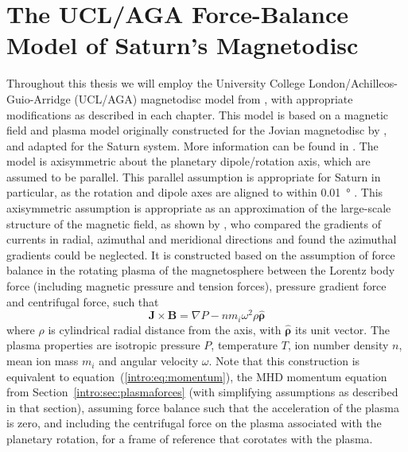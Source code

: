 \section{The UCL/AGA Force-Balance Model of Saturn's Magnetodisc}\label{intro:sec:forcebalancemodel}
Throughout this thesis we will employ the University College London/Achilleos-Guio-Arridge (UCL/AGA) magnetodisc model from \citet{achilleos2010a,achilleos2010b}, with appropriate modifications as described in each chapter. This model is based on a magnetic field and plasma model originally constructed for the Jovian magnetodisc by \citet{caudal1986}, and adapted for the Saturn system. More information can be found in \citet{achilleos2010a, achilleos2010b}. The model is axisymmetric about the planetary dipole/rotation axis, which are assumed to be parallel. This parallel assumption is appropriate for Saturn in particular, as the rotation and dipole axes are aligned to within \SI{0.01}{\degree} \citep{dougherty2018}. This axisymmetric assumption is appropriate as an approximation of the large-scale structure of the magnetic field, as shown by \citet{hunt2014}, who compared the gradients of currents in radial, azimuthal and meridional directions and found the azimuthal gradients could be neglected. It is constructed based on the assumption of force balance in the rotating plasma of the magnetosphere between the Lorentz body force (including magnetic pressure and tension forces), pressure gradient force and centrifugal force, such that 
\begin{equation}\label{intro:eq:forcebalance}
\boldsymbol{J} \times \boldsymbol{B} = \nabla P - nm_i\omega^2\rho\boldsymbol{\hat{\rho}}
\end{equation}
where $\rho$ is cylindrical radial distance from the axis, with $\boldsymbol{\hat{\rho}}$ its unit vector. The plasma properties are isotropic pressure $P$, temperature $T$, ion number density $n$, mean ion mass $m_i$ and angular velocity $\omega$. Note that this construction is equivalent to equation~(\ref{intro:eq:momentum}), the MHD momentum equation from Section~\ref{intro:sec:plasmaforces} (with simplifying assumptions as described in that section), assuming force balance such that the acceleration of the plasma is zero, and including the centrifugal force on the plasma associated with the planetary rotation, for a frame of reference that corotates with the plasma.

